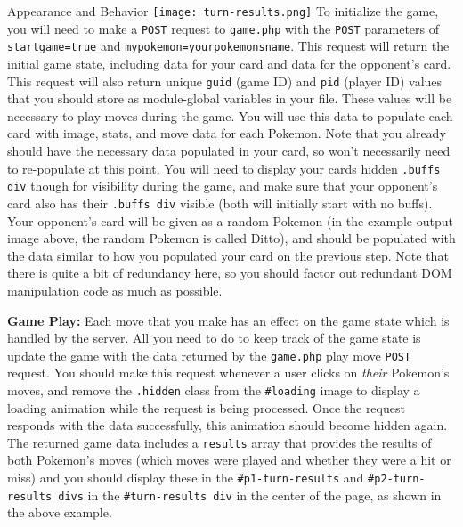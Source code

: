 \documentclass[programming]{../../../../mfcs}
\begin{document}
\begin{question}{Appearance and Behavior}
  \vspace{0.5em}
  \texttt{[image: turn-results.png]}
  \newline
  To initialize the game, you will need to make a \texttt{POST}
  request to \texttt{game.php} with the \texttt{POST} parameters of \texttt{startgame=true} and
  \texttt{mypokemon=yourpokemonsname}. This request will return the initial game state, including
  data for your card and data for the opponent's card. This request will also return unique
  \texttt{guid} (game ID) and \texttt{pid} (player ID) values that you should store as module-global variables in your
  file. These values will be necessary to play moves during the game. You will use this data to populate each card
  with image, stats, and move data for each Pokemon. Note that you already should have the necessary
  data populated in your card, so won't necessarily need to re-populate at this point. You will need
  to display your cards hidden \texttt{.buffs div} though for visibility during the game, and make
  sure that your opponent's card also has their \texttt{.buffs div} visible (both will initially
  start with no buffs). Your
  opponent's card will be given as a random Pokemon (in the example output image above, the random
  Pokemon is called Ditto), and should be populated with the data similar to how you populated your card on the
  previous step. Note that there is quite a bit of redundancy here, so you should factor out
  redundant DOM manipulation code as much as possible.
  \newline

\textbf{Game Play:}
Each move that you make has an effect on the game state which is handled by the server. All you need
to do to keep track of the game state is update the game with the data returned by the
\texttt{game.php} play move \texttt{POST} request.
You should make this request whenever a user
clicks on \emph{their} Pokemon's moves, and remove the \texttt{.hidden} class from the
\texttt{\#loading} image to display a loading animation while the request is being processed. 
Once the request responds with the data successfully, this animation should become hidden again. The returned game data includes a \texttt{results} array
that provides the results of both Pokemon's moves (which moves were played and whether they were a hit or miss) and you should
display these in the \texttt{\#p1-turn-results} and \texttt{\#p2-turn-results divs} in the
\texttt{\#turn-results div} in the center of the page, as shown in the above example.
\newpage


\end{question}
\end{document}
